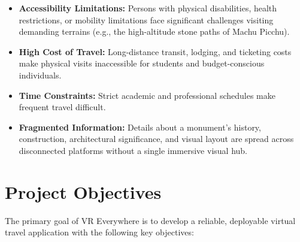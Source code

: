 \documentclass{tietreport}
\begin{document}
\begin{itemize}
  \item \textbf{Accessibility Limitations:} Persons with physical disabilities, health restrictions, or mobility limitations face significant challenges visiting demanding terrains (e.g., the high-altitude stone paths of Machu Picchu).
  \item \textbf{High Cost of Travel:} Long-distance transit, lodging, and ticketing costs make physical visits inaccessible for students and budget-conscious individuals.
  \item \textbf{Time Constraints:} Strict academic and professional schedules make frequent travel difficult.
  \item \textbf{Fragmented Information:} Details about a monument's history, construction, architectural significance, and visual layout are spread across disconnected platforms without a single immersive visual hub.
\end{itemize}

\section{Project Objectives}

The primary goal of VR Everywhere is to develop a reliable, deployable virtual travel application with the following key objectives:
\end{document}
